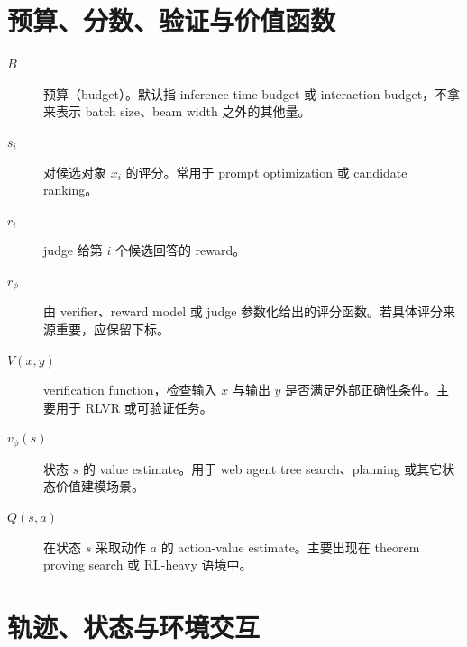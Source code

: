 \section{预算、分数、验证与价值函数}

\begin{description}
\item[$B$] 预算（budget）。默认指 inference-time budget 或 interaction budget，不拿来表示 batch size、beam width 之外的其他量。

\item[$s_i$] 对候选对象 $x_i$ 的评分。常用于 prompt optimization 或 candidate ranking。

\item[$r_i$] judge 给第 $i$ 个候选回答的 reward。

\item[$r_\phi$] 由 verifier、reward model 或 judge 参数化给出的评分函数。若具体评分来源重要，应保留下标。

\item[$V(x,y)$] verification function，检查输入 $x$ 与输出 $y$ 是否满足外部正确性条件。主要用于 RLVR 或可验证任务。

\item[$v_\phi(s)$] 状态 $s$ 的 value estimate。用于 web agent tree search、planning 或其它状态价值建模场景。

\item[$Q(s,a)$] 在状态 $s$ 采取动作 $a$ 的 action-value estimate。主要出现在 theorem proving search 或 RL-heavy 语境中。
\end{description}

\section{轨迹、状态与环境交互}

